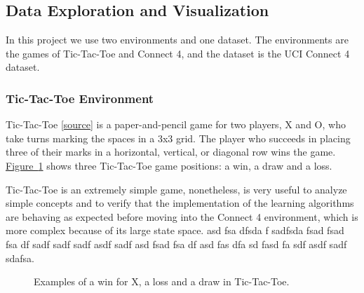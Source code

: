 \documentclass{article}
\newcommand{\GithubURL}[1]{[\href{https://github.com/davidrobles/mlnd-capstone-code/blob/master/#1}{source}]}
\begin{document}
\subsection{Data Exploration and Visualization}

In this project we use two environments and one dataset. The environments are the games of
Tic-Tac-Toe and Connect 4, and the dataset is the UCI Connect 4 dataset.

\subsubsection{Tic-Tac-Toe Environment}

Tic-Tac-Toe \GithubURL{capstone/game/games/tictactoe.py} is a paper-and-pencil game for two players,
X and O, who take turns marking the spaces in a 3x3 grid. The player who succeeds in placing three
of their marks in a horizontal, vertical, or diagonal row wins the game.
\hyperref[fig:tic-env]{Figure~\ref*{fig:tic-env}} shows three Tic-Tac-Toe game positions: a win, a
draw and a loss.

Tic-Tac-Toe is an extremely simple game, nonetheless, is very useful to analyze simple concepts and
to verify that the implementation of the learning algorithms are behaving as expected before moving
into the Connect 4 environment, which is more complex because of its large state space. asd fsa
dfsda f sadfsda fsad fsad fsa df sadf sadf sadf asdf sadf asd fsad fsa df asd fas dfa sd fasd fa sdf
asdf sadf sdafsa.


\begin{figure}[!b]
    \centering
     \hspace{0.2in}
     \hspace{0.2in}
    \caption{Examples of a win for X, a loss and a draw in Tic-Tac-Toe.}
    \label{fig:tic-env}
\end{figure}
\end{document}
